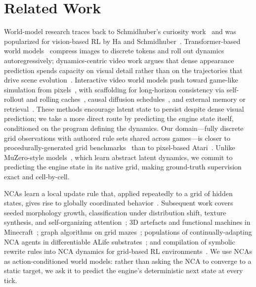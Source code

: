 \section{Related Work}
\label{sec:related}

World-model research traces back to Schmidhuber's curiosity
work~\cite{schmidhuber1990make,schmidhuber2022annotated} and was
popularized for vision-based RL by Ha and
Schmidhuber~\cite{ha2018world}. Transformer-based world
models~\cite{micheli2022iris,robine2023transformer} compress images to
discrete tokens and roll out dynamics autoregressively;
dynamics-centric video work argues that dense appearance prediction
spends capacity on visual detail rather than on the trajectories that
drive scene evolution~\cite{baumann2026envisioning}. Interactive video
world models push toward game-like simulation from
pixels~\cite{valevski2025gamengen,parkerholder2025genie3,savva2026solaris},
with scaffolding for long-horizon consistency via self-rollout and
rolling caches~\cite{huang2025selfforcing}, causal diffusion
schedules~\cite{chen2024diffusionforcing}, and external memory or
retrieval~\cite{xiao2025worldmem,oshima2025worldpack}. These methods
encourage latent state to persist despite dense visual prediction; we
take a more direct route by predicting the engine state itself,
conditioned on the program defining the dynamics. Our domain---fully
discrete grid observations with authored rule sets shared across
games---is closer to procedurally-generated grid
benchmarks~\cite{kuettler2020nethack,samvelyan2021minihack,hafner2021crafter,matthews2024craftax}
than to pixel-based Atari~\cite{bellemare2013arcade}. Unlike MuZero-style
models~\cite{schrittwieser2020muzero}, which learn abstract latent
dynamics, we commit to predicting the engine state in its native grid,
making ground-truth supervision exact and cell-by-cell.

NCAs learn a local update rule that, applied repeatedly to a grid of
hidden states, gives rise to globally coordinated
behavior~\cite{mordvintsev2020growing}. Subsequent work covers seeded
morphology growth, classification under distribution shift, texture
synthesis, and self-organizing
attention~\cite{niklasson2021selforganising,palm2022variational,najarro2022hypernca};
3D artefacts and functional machines in
Minecraft~\cite{sudhakaran2021growing}; graph algorithms on grid
mazes~\cite{earle2023pathfinding}; populations of continually-adapting
NCA agents in differentiable ALife
substrates~\cite{berdica2026pbtnca}; and compilation of symbolic
rewrite rules into NCA dynamics for grid-based RL
environments~\cite{earle2025autoverse}. We use NCAs as
action-conditioned world models: rather than asking the NCA to
converge to a static target, we ask it to predict the engine's
deterministic next state at every tick.

